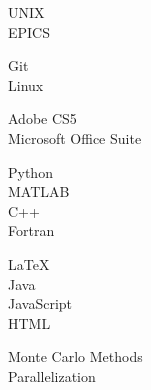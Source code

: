 \begin{minipage}[t]{0.2\textwidth}
	\flushleft
\end{minipage}
\begin{minipage}[t]{0.75\textwidth}
	{
		\begin{minipage}[t]{0.30\textwidth}
			UNIX\\
			EPICS
		\end{minipage}
		\begin{minipage}[t]{0.30\textwidth}
			Git\\
			Linux
		\end{minipage}
		\begin{minipage}[t]{0.30\textwidth}
			Adobe CS5\\
			Microsoft Office Suite
		\end{minipage}
	}
	
	\vspace*{4pt}
	{
		\begin{minipage}[t]{0.30\textwidth}
			Python\\
			MATLAB\\
			C++\\
			Fortran
		\end{minipage}
		\begin{minipage}[t]{0.30\textwidth}
			\LaTeX\\
			Java\\
			JavaScript\\
			HTML
		\end{minipage}
		\begin{minipage}[t]{0.30\textwidth}
			Monte Carlo Methods\\
			Parallelization
		\end{minipage}
	}
	
	

\end{minipage}
